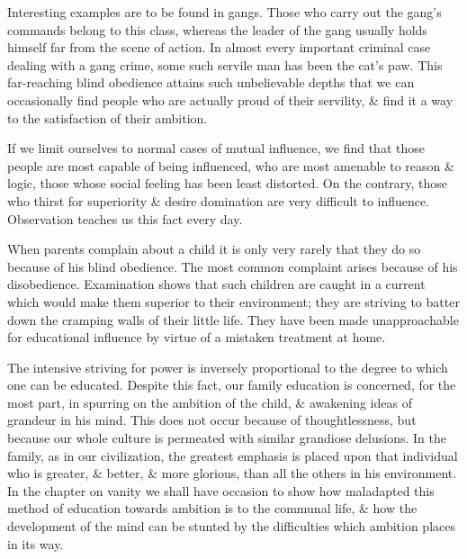 \documentclass{article}
\begin{document}
Interesting examples are to be found in gangs. Those who carry out the gang's commands belong to this class, whereas the leader of the gang usually holds himself far from the scene of action. In almost every important criminal case dealing with a gang crime, some such servile man has been the cat's paw. This far-reaching blind obedience attains such unbelievable depths that we can occasionally find people who are actually proud of their servility, \& find it a way to the satisfaction of their ambition.

If we limit ourselves to normal cases of mutual influence, we find that those people are most capable of being influenced, who are most amenable to reason \& logic, those whose social feeling has been least distorted. On the contrary, those who thirst for superiority \& desire domination are very difficult to influence. Observation teaches us this fact every day.

When parents complain about a child it is only very rarely that they do so because of his blind obedience. The most common complaint arises because of his disobedience. Examination shows that such children are caught in a current which would make them superior to their environment; they are striving to batter down the cramping walls of their little life. They have been made unapproachable for educational influence by virtue of a mistaken treatment at home.

The intensive striving for power is inversely proportional to the degree to which one can be educated. Despite this fact, our family education is concerned, for the most part, in spurring on the ambition of the child, \& awakening ideas of grandeur in his mind. This does not occur because of thoughtlessness, but because our whole culture is permeated with similar grandiose delusions. In the family, as in our civilization, the greatest emphasis is placed upon that individual who is greater, \& better, \& more glorious, than all the others in his environment. In the chapter on vanity we shall have occasion to show how maladapted this method of education towards ambition is to the communal life, \& how the development of the mind can be stunted by the difficulties which ambition places in its way.
\end{document}
